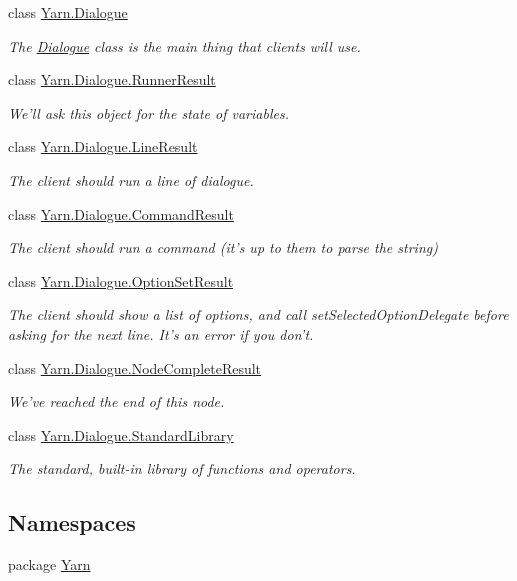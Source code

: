 \begin{DoxyCompactItemize}
class \hyperlink{a00090}{Yarn.\-Dialogue}
\begin{DoxyCompactList}\small\item\em The \hyperlink{a00090}{Dialogue} class is the main thing that clients will use. \end{DoxyCompactList}\item 
class \hyperlink{a00143}{Yarn.\-Dialogue.\-Runner\-Result}
\begin{DoxyCompactList}\small\item\em We'll ask this object for the state of variables. \end{DoxyCompactList}\item 
class \hyperlink{a00126}{Yarn.\-Dialogue.\-Line\-Result}
\begin{DoxyCompactList}\small\item\em The client should run a line of dialogue. \end{DoxyCompactList}\item 
class \hyperlink{a00051}{Yarn.\-Dialogue.\-Command\-Result}
\begin{DoxyCompactList}\small\item\em The client should run a command (it's up to them to parse the string) \end{DoxyCompactList}\item 
class \hyperlink{a00136}{Yarn.\-Dialogue.\-Option\-Set\-Result}
\begin{DoxyCompactList}\small\item\em The client should show a list of options, and call set\-Selected\-Option\-Delegate before asking for the next line. It's an error if you don't. \end{DoxyCompactList}\item 
class \hyperlink{a00132}{Yarn.\-Dialogue.\-Node\-Complete\-Result}
\begin{DoxyCompactList}\small\item\em We've reached the end of this node. \end{DoxyCompactList}\item 
class \hyperlink{a00149}{Yarn.\-Dialogue.\-Standard\-Library}
\begin{DoxyCompactList}\small\item\em The standard, built-\/in library of functions and operators. \end{DoxyCompactList}\end{DoxyCompactItemize}
\subsection*{Namespaces}
\begin{DoxyCompactItemize}
\item 
package \hyperlink{a00050}{Yarn}
\end{DoxyCompactItemize}
